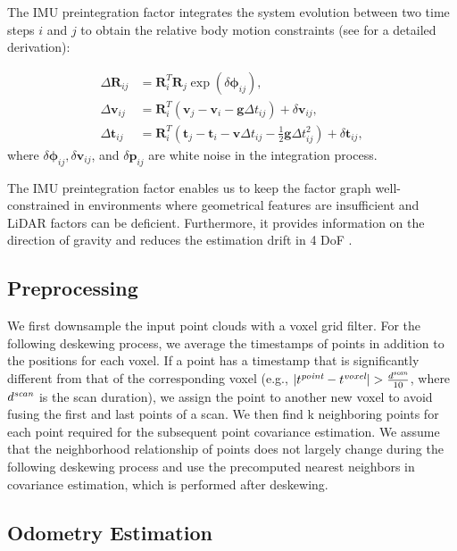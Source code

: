 \documentclass[letterpaper, 10 pt, conference]{ieeeconf}  %
\begin{document}
The IMU preintegration factor integrates the system evolution between two time steps $i$ and $j$ to obtain the relative body motion constraints (see \cite{Forster2017} for a detailed derivation):

\begin{align}
\label{eq:preint_R}
\Delta {\bm R}_{ij} &= {\bm R}_i^T {\bm R}_j \exp \left( \delta {\bm \phi}_{ij} \right), \\
\Delta {\bm v}_{ij} &= {\bm R}_i^T \left( {\bm v}_j - {\bm v}_i -{\bm g} \Delta t_{ij} \right) + \delta {\bm v}_{ij}, \\
\Delta {\bm t}_{ij} &= {\bm R}_i^T \left( {\bm t}_j - {\bm t}_i - {\bm v} \Delta t_{ij} - \frac{1}{2} {\bm g} \Delta t_{ij}^2 \right) + \delta {\bm t}_{ij},
\end{align}
where $\delta {\bm \phi}_{ij}, \delta {\bm v}_{ij}$, and $\delta {\bm p}_{ij}$ are white noise in the integration process. 

The IMU preintegration factor enables us to keep the factor graph well-constrained in environments where geometrical features are insufficient and LiDAR factors can be deficient. Furthermore, it provides information on the direction of gravity and reduces the estimation drift in 4 DoF \cite{Qin2018}.

\subsection{Preprocessing}
\label{sec:preprocess}

We first downsample the input point clouds with a voxel grid filter. For the following deskewing process, we average the timestamps of points in addition to the positions for each voxel. 
If a point has a timestamp that is significantly different from that of the corresponding voxel (e.g., $|t^{\text{\it point}} - t^{\text{\it voxel}}| > \frac{d^{\text{\it scan}}}{10}$, where $d^{\text{\it scan}}$ is the scan duration), we assign the point to another new voxel to avoid fusing the first and last points of a scan. We then find k neighboring points for each point required for the subsequent point covariance estimation. We assume that the neighborhood relationship of points does not largely change during the following deskewing process and use the precomputed nearest neighbors in covariance estimation, which is performed after deskewing.


\subsection{Odometry Estimation}
\label{sec:odometry}
\end{document}
